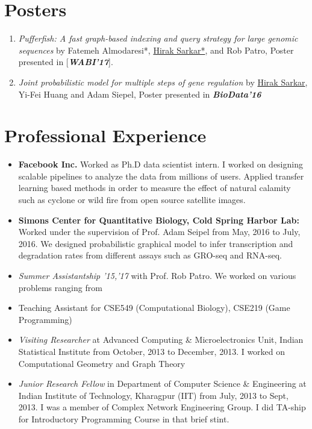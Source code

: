 \documentclass{res}
\begin{document}
\begin{resume}
\section{Posters}
\begin{enumerate}
\item {\it Pufferfish: A fast graph-based indexing and query strategy for large genomic sequences} by Fatemeh Almodaresi*, \underline{Hirak Sarkar*}, and Rob Patro, Poster presented in [\textit{\textbf{WABI'17}}].

\item {\it Joint probabilistic model for multiple steps of gene regulation} by \underline{Hirak Sarkar}, Yi-Fei Huang and Adam Siepel, Poster presented in  \textit{\textbf{BioData'16}}
\vspace{-0.5cm}
\end{enumerate}


\section{Professional Experience}
\begin{itemize}
\item {\textbf {Facebook Inc.}} Worked as Ph.D data scientist intern. I worked on designing scalable pipelines to analyze the data from millions of users. Applied transfer learning based methods in order to measure the effect of natural calamity such as cyclone or wild fire from open source satellite images.   

\item {\textbf {Simons Center for Quantitative Biology, Cold Spring Harbor Lab:}} Worked under the supervision of Prof. Adam Seipel from May, 2016 to July, 2016. We designed probabilistic graphical model to infer transcription and degradation rates from different assays such as GRO-seq and RNA-seq.  

\item {\it Summer Assistantship '15,'17} with Prof. Rob Patro. We worked on various problems ranging from 
\item  Teaching Assistant for CSE549 (Computational Biology), CSE219 (Game Programming)
\item {\it Visiting Researcher} at Advanced Computing \& Microelectronics Unit, Indian Statistical Institute from October, 2013 to December, 
2013. I worked on Computational Geometry and Graph Theory
\item {\it Junior Research Fellow} in Department of Computer Science \& Engineering at Indian Institute of Technology, Kharagpur (IIT) 
from July, 2013 to Sept, 2013. I was a member of Complex Network Engineering Group. I did TA-ship for Introductory Programming 
Course in that brief stint. 
\end{itemize}


\end{resume}
\end{document}
